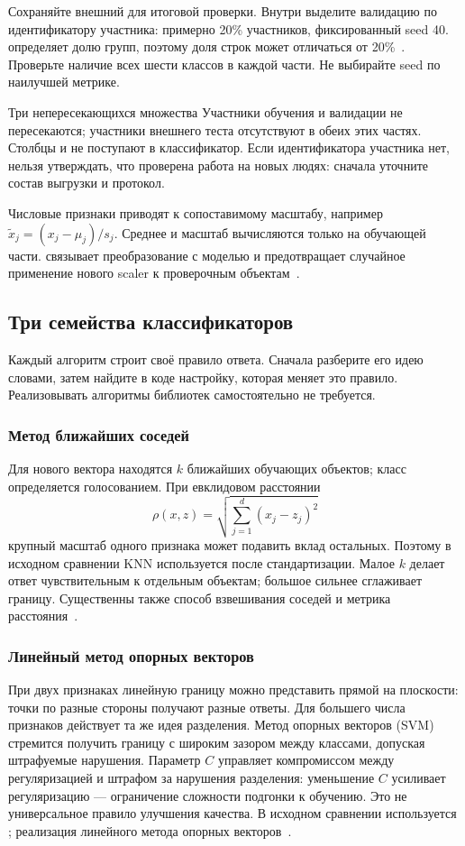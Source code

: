 Сохраняйте внешний  для итоговой проверки. Внутри  выделите валидацию по идентификатору участника: примерно 20\% участников, фиксированный seed 40.  определяет долю групп, поэтому доля строк может отличаться от 20\%~\cite{groupsplit}. Проверьте наличие всех шести классов в каждой части. Не выбирайте seed по наилучшей метрике.

\begin{keybox}{Три непересекающихся множества}
Участники обучения и валидации не пересекаются; участники внешнего теста отсутствуют в обеих этих частях. Столбцы  и  не поступают в классификатор. Если идентификатора участника нет, нельзя утверждать, что проверена работа на новых людях: сначала уточните состав выгрузки и протокол.
\end{keybox}

Числовые признаки приводят к сопоставимому масштабу, например \(\widetilde x_j=(x_j-\mu_j)/s_j\). Среднее и масштаб вычисляются только на обучающей части.  связывает преобразование с моделью и предотвращает случайное применение нового scaler к проверочным объектам~\cite{pitfalls,scaler}.

\subsection{Три семейства классификаторов}
Каждый алгоритм строит своё правило ответа. Сначала разберите его идею словами, затем найдите в коде настройку, которая меняет это правило. Реализовывать алгоритмы библиотек самостоятельно не требуется.
\subsubsection*{Метод ближайших соседей}
Для нового вектора находятся \(k\) ближайших обучающих объектов; класс определяется голосованием. При евклидовом расстоянии
\begin{equation}
\rho(x,z)=\sqrt{\sum_{j=1}^d(x_j-z_j)^2}
\end{equation}
крупный масштаб одного признака может подавить вклад остальных. Поэтому в исходном сравнении KNN используется после стандартизации. Малое \(k\) делает ответ чувствительным к отдельным объектам; большое сильнее сглаживает границу. Существенны также способ взвешивания соседей и метрика расстояния~\cite{knn}.

\subsubsection*{Линейный метод опорных векторов}
При двух признаках линейную границу можно представить прямой на плоскости: точки по разные стороны получают разные ответы. Для большего числа признаков действует та же идея разделения. Метод опорных векторов (SVM) стремится получить границу с широким зазором между классами, допуская штрафуемые нарушения. Параметр \(C\) управляет компромиссом между регуляризацией и штрафом за нарушения разделения: уменьшение \(C\) усиливает регуляризацию --- ограничение сложности подгонки к обучению. Это не универсальное правило улучшения качества. В исходном сравнении используется ; реализация линейного метода опорных векторов~\cite{linearsvc}.

